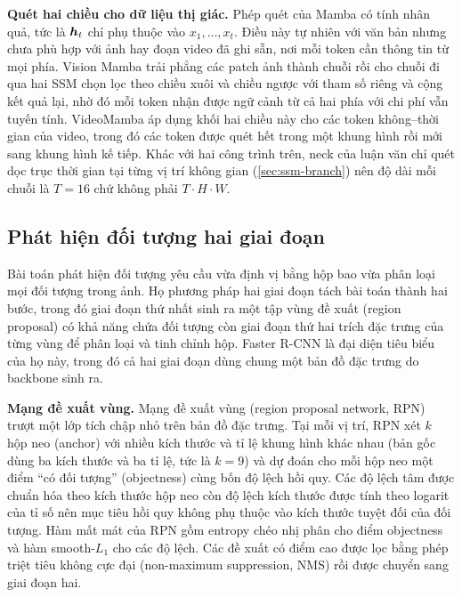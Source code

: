 \textbf{Quét hai chiều cho dữ liệu thị giác.} Phép quét của Mamba có tính nhân quả, tức là $\bm{h}_t$ chỉ phụ thuộc vào $x_1, \dots, x_t$. Điều này tự nhiên với văn bản nhưng chưa phù hợp với ảnh hay đoạn video đã ghi sẵn, nơi mỗi token cần thông tin từ mọi phía. Vision Mamba \cite{zhu2024vim} trải phẳng các patch ảnh thành chuỗi rồi cho chuỗi đi qua hai SSM chọn lọc theo chiều xuôi và chiều ngược với tham số riêng và cộng kết quả lại, nhờ đó mỗi token nhận được ngữ cảnh từ cả hai phía với chi phí vẫn tuyến tính. VideoMamba \cite{li2024videomamba} áp dụng khối hai chiều này cho các token không--thời gian của video, trong đó các token được quét hết trong một khung hình rồi mới sang khung hình kế tiếp. Khác với hai công trình trên, neck của luận văn chỉ quét dọc trục thời gian tại từng vị trí không gian (\cref{sec:ssm-branch}) nên độ dài mỗi chuỗi là $T = 16$ chứ không phải $T \cdot H \cdot W$.

\subsection{Phát hiện đối tượng hai giai đoạn}
\label{sec:detection}

Bài toán phát hiện đối tượng yêu cầu vừa định vị bằng hộp bao vừa phân loại mọi đối tượng trong ảnh. Họ phương pháp hai giai đoạn tách bài toán thành hai bước, trong đó giai đoạn thứ nhất sinh ra một tập vùng đề xuất (region proposal) có khả năng chứa đối tượng còn giai đoạn thứ hai trích đặc trưng của từng vùng để phân loại và tinh chỉnh hộp. Faster R-CNN \cite{ren2015fasterrcnn} là đại diện tiêu biểu của họ này, trong đó cả hai giai đoạn dùng chung một bản đồ đặc trưng do backbone sinh ra.

\textbf{Mạng đề xuất vùng.} Mạng đề xuất vùng (region proposal network, RPN) trượt một lớp tích chập nhỏ trên bản đồ đặc trưng. Tại mỗi vị trí, RPN xét $k$ hộp neo (anchor) với nhiều kích thước và tỉ lệ khung hình khác nhau (bản gốc dùng ba kích thước và ba tỉ lệ, tức là $k = 9$) và dự đoán cho mỗi hộp neo một điểm ``có đối tượng'' (objectness) cùng bốn độ lệch hồi quy. Các độ lệch tâm được chuẩn hóa theo kích thước hộp neo còn độ lệch kích thước được tính theo logarit của tỉ số nên mục tiêu hồi quy không phụ thuộc vào kích thước tuyệt đối của đối tượng. Hàm mất mát của RPN gồm entropy chéo nhị phân cho điểm objectness và hàm smooth-$L_1$ cho các độ lệch. Các đề xuất có điểm cao được lọc bằng phép triệt tiêu không cực đại (non-maximum suppression, NMS) rồi được chuyển sang giai đoạn hai.

